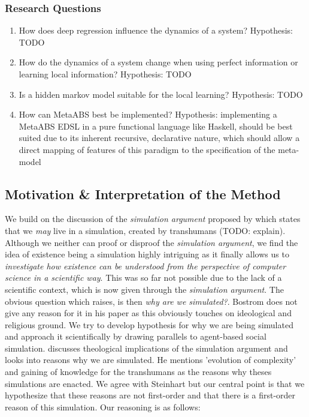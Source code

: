 \subsubsection{Research Questions} 
\begin{enumerate}
	\item How does deep regression influence the dynamics of a system? Hypothesis: TODO
	\item How do the dynamics of a system change when using perfect information or learning local information? Hypothesis: TODO
	\item Is a hidden markov model suitable for the local learning? Hypothesis: TODO
	\item How can MetaABS best be implemented? Hypothesis: implementing a MetaABS EDSL in a pure functional language like Haskell, should be best suited due to its inherent recursive, declarative nature, which should allow a direct mapping of features of this paradigm to the specification of the meta-model
\end{enumerate}

\subsection{Motivation \& Interpretation of the Method}
We build on the discussion of the \textit{simulation argument} proposed by \cite{bostrom_are_2003} which states that we \textit{may} live in a simulation, created by transhumans (TODO: explain). Although we neither can proof or disproof the \textit{simulation argument}, we find the idea of existence being a simulation highly intriguing as it finally allows us to \textit{investigate how existence can be understood from the perspective of computer science in a scientific way}. This was so far not possible due to the lack of a scientific context, which is now given through the \textit{simulation argument}. The obvious question which raises, is then \textit{why are we simulated?}. Bostrom does not give any reason for it in his paper as this obviously touches on ideological and religious ground. We try to develop hypothesis for why we are being simulated and approach it scientifically by drawing parallels to agent-based social simulation.
\cite{steinhart_theological_2010} discusses theological implications of the simulation argument and looks into reasons why we are simulated. He mentions 'evolution of complexity' and gaining of knowledge for the transhumans as the reasons why theses simulations are enacted. We agree with Steinhart but our central point is that we hypothesize that these reasons are not first-order and that there is a first-order reason of this simulation. Our reasoning is as follows:

